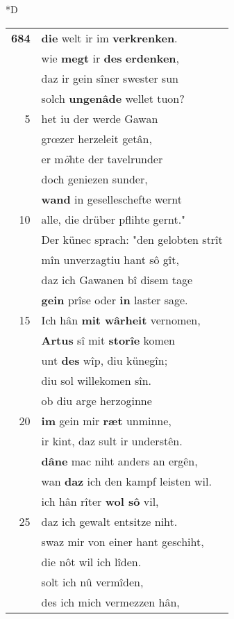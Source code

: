 \documentclass[8pt,a4paper,notitlepage]{article}
\begin{document}
\begin{table}[ht]
\begin{minipage}[t]{0.5\linewidth}
\small
\begin{center}*D
\end{center}
\begin{tabular}{rl}
\textbf{684} & \textbf{die} welt ir im \textbf{verkrenken}.\\ 
 & wie \textbf{megt} ir \textbf{des} \textbf{erdenken},\\ 
 & daz ir gein sîner swester sun\\ 
 & solch \textbf{ungenâde} wellet tuon?\\ 
5 & het iu der werde Gawan\\ 
 & grœzer herzeleit getân,\\ 
 & er m\textit{ö}hte der tavelrunder\\ 
 & doch geniezen sunder,\\ 
 & \textbf{wand} in geselleschefte wernt\\ 
10 & alle, die drüber pflihte gernt."\\ 
 & Der künec sprach: "den gelobten strît\\ 
 & mîn unverzagtiu hant sô gît,\\ 
 & daz ich Gawanen bî disem tage\\ 
 & \textbf{gein} prîse oder \textbf{in} laster sage.\\ 
15 & Ich hân \textbf{mit wârheit} vernomen,\\ 
 & \textbf{Artus} sî mit \textbf{storîe} komen\\ 
 & unt \textbf{des} wîp, diu künegîn;\\ 
 & diu sol willekomen sîn.\\ 
 & ob diu arge herzoginne\\ 
20 & \textbf{im} gein mir \textbf{ræt} unminne,\\ 
 & ir kint, daz sult ir understên.\\ 
 & \textbf{dâ}\textbf{ne} mac niht anders an ergên,\\ 
 & wan \textbf{daz} ich den kampf leisten wil.\\ 
 & ich hân rîter \textbf{wol sô} vil,\\ 
25 & daz ich gewalt entsitze niht.\\ 
 & swaz mir von einer hant geschiht,\\ 
 & die nôt wil ich lîden.\\ 
 & solt ich nû vermîden,\\ 
 & des ich mich vermezzen hân,\\ 

\end{tabular}
\end{minipage}
\end{table}
\end{document}
